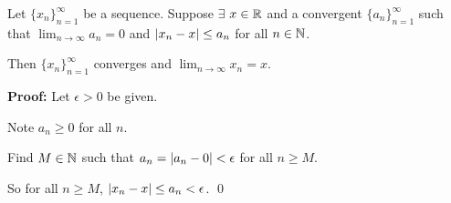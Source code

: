 \documentclass[10pt,aspectratio=149]{beamer}
\begin{document}
\begin{frame}

\begin{proposition}
Let $\{ x_n \}_{n=1}^\infty$ be a sequence. 
Suppose $\exists$ $x \in {\mathbb{R}}$
and a convergent $\{ a_n \}_{n=1}^\infty$
such that
\quad
$\displaystyle \lim_{n\to\infty} a_n = 0$
\quad
and 
\quad
$\displaystyle
\left\lvert {x_n - x} \right\rvert \leq a_n$
for all $n \in {\mathbb{N}}$.

\pause
Then $\{ x_n \}_{n=1}^\infty$ converges and $\displaystyle \lim_{n\to\infty} x_n = x$.
\end{proposition}

\pause
\textbf{Proof:}
Let $\epsilon > 0$ be given.

\pause
\medskip

Note $a_n \geq 0$ for all $n$.

\pause
\medskip

Find $M \in {\mathbb{N}}$ such that $a_n = \left\lvert {a_n - 0} \right\rvert < \epsilon$ for all $n \geq M$.

\pause
\medskip

So for all
$n \geq M$, \quad
$\left\lvert {x_n - x} \right\rvert \leq a_n < \epsilon$.
\qed

\end{frame}
\end{document}
